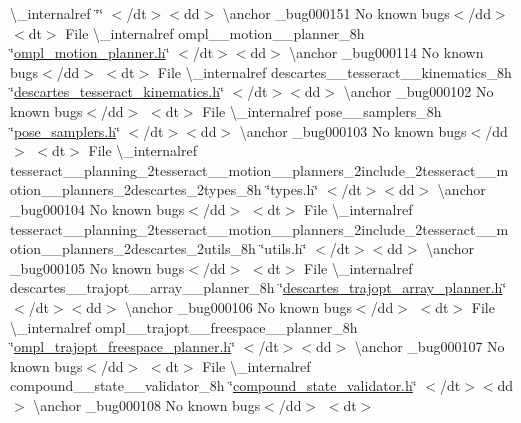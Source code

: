 \begin{DoxyRefList}
 \textbackslash{}\+\_\+internalref  \char`\"{}\char`\"{} $<$/dt$>$$<$dd$>$ \textbackslash{}anchor \+\_\+bug000151 No known bugs$<$/dd$>$ $<$dt$>$
\+File \textbackslash{}\+\_\+internalref ompl\+\_\+\+\_\+motion\+\_\+\+\_\+planner\+\_\+8h \char`\"{}\mbox{\hyperlink{ompl__motion__planner_8h}{ompl\+\_\+motion\+\_\+planner.\+h}}\char`\"{} $<$/dt$>$$<$dd$>$ \textbackslash{}anchor \+\_\+bug000114 No known bugs$<$/dd$>$ $<$dt$>$
\+File \textbackslash{}\+\_\+internalref descartes\+\_\+\+\_\+tesseract\+\_\+\+\_\+kinematics\+\_\+8h \char`\"{}\mbox{\hyperlink{descartes__tesseract__kinematics_8h}{descartes\+\_\+tesseract\+\_\+kinematics.\+h}}\char`\"{} $<$/dt$>$$<$dd$>$ \textbackslash{}anchor \+\_\+bug000102 No known bugs$<$/dd$>$ $<$dt$>$
\+File \textbackslash{}\+\_\+internalref pose\+\_\+\+\_\+samplers\+\_\+8h \char`\"{}\mbox{\hyperlink{pose__samplers_8h}{pose\+\_\+samplers.\+h}}\char`\"{} $<$/dt$>$$<$dd$>$ \textbackslash{}anchor \+\_\+bug000103 No known bugs$<$/dd$>$ $<$dt$>$
\+File \textbackslash{}\+\_\+internalref tesseract\+\_\+\+\_\+planning\+\_\+2tesseract\+\_\+\+\_\+motion\+\_\+\+\_\+planners\+\_\+2include\+\_\+2tesseract\+\_\+\+\_\+motion\+\_\+\+\_\+planners\+\_\+2descartes\+\_\+2types\+\_\+8h \char`\"{}types.\+h\char`\"{} $<$/dt$>$$<$dd$>$ \textbackslash{}anchor \+\_\+bug000104 No known bugs$<$/dd$>$ $<$dt$>$
\+File \textbackslash{}\+\_\+internalref tesseract\+\_\+\+\_\+planning\+\_\+2tesseract\+\_\+\+\_\+motion\+\_\+\+\_\+planners\+\_\+2include\+\_\+2tesseract\+\_\+\+\_\+motion\+\_\+\+\_\+planners\+\_\+2descartes\+\_\+2utils\+\_\+8h \char`\"{}utils.\+h\char`\"{} $<$/dt$>$$<$dd$>$ \textbackslash{}anchor \+\_\+bug000105 No known bugs$<$/dd$>$ $<$dt$>$
\+File \textbackslash{}\+\_\+internalref descartes\+\_\+\+\_\+trajopt\+\_\+\+\_\+array\+\_\+\+\_\+planner\+\_\+8h \char`\"{}\mbox{\hyperlink{descartes__trajopt__array__planner_8h}{descartes\+\_\+trajopt\+\_\+array\+\_\+planner.\+h}}\char`\"{} $<$/dt$>$$<$dd$>$ \textbackslash{}anchor \+\_\+bug000106 No known bugs$<$/dd$>$ $<$dt$>$
\+File \textbackslash{}\+\_\+internalref ompl\+\_\+\+\_\+trajopt\+\_\+\+\_\+freespace\+\_\+\+\_\+planner\+\_\+8h \char`\"{}\mbox{\hyperlink{ompl__trajopt__freespace__planner_8h}{ompl\+\_\+trajopt\+\_\+freespace\+\_\+planner.\+h}}\char`\"{} $<$/dt$>$$<$dd$>$ \textbackslash{}anchor \+\_\+bug000107 No known bugs$<$/dd$>$ $<$dt$>$
\+File \textbackslash{}\+\_\+internalref compound\+\_\+\+\_\+state\+\_\+\+\_\+validator\+\_\+8h \char`\"{}\mbox{\hyperlink{compound__state__validator_8h}{compound\+\_\+state\+\_\+validator.\+h}}\char`\"{} $<$/dt$>$$<$dd$>$ \textbackslash{}anchor \+\_\+bug000108 No known bugs$<$/dd$>$ $<$dt$>$
$$
\end{DoxyRefList}
